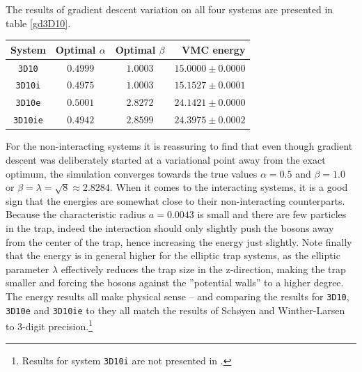 \documentclass[a4paper,8pt]{article}
\begin{document}
\begin{multicols}{2}
The results of gradient descent variation on all four systems are presented in table \ref{gd3D10}.

\begin{center}\small
{}
\label{gd3D10}
\begin{tabular}{cccr}
	\hline\hline
	System & Optimal $\alpha$ & Optimal $\beta$ & VMC energy \\
	\hline
    \texttt{3D10} & $0.4999$ & $1.0003$ & $15.0000 \pm 0.0000$\\
    \texttt{3D10i} & $0.4975$ & $1.0003$ & $15.1527 \pm 0.0001$\\ 
    \texttt{3D10e} & $0.5001$ & $2.8272$ & $24.1421 \pm 0.0000$\\
    \texttt{3D10ie} & $0.4942$ & $2.8599$ & $24.3975 \pm 0.0002$\\
    \hline\hline
\end{tabular}
\end{center}

For the non-interacting systems it is reassuring to find that even though gradient descent was deliberately started at a variational point away from the exact optimum, the simulation converges towards the true values ${\alpha = 0.5}$ and ${\beta = 1.0}$ or ${\beta = \lambda} = {\sqrt{8} \approx 2.8284}$. When it comes to the interacting systems, it is a good sign that the energies are somewhat close to their non-interacting counterparts. Because the characteristic radius ${a = 0.0043}$ is small and there are few particles in the trap, indeed the interaction should only slightly push the bosons away from the center of the trap, hence increasing the energy just slightly. Note finally that the energy is in general higher for the elliptic trap systems, as the elliptic parameter $\lambda$ effectively reduces the trap size in the z-direction, making the trap smaller and forcing the bosons against the ''potential walls'' to a higher degree. The energy results all make physical sense -- and comparing the results for \texttt{3D10}, \texttt{3D10e} and \texttt{3D10ie} to \cite{SWL} they all match the results of Schøyen and Winther-Larsen to 3-digit precision.\footnote{Results for system \texttt{3D10i} are not presented in \cite{SWL}.}


\end{multicols}
\end{document}
